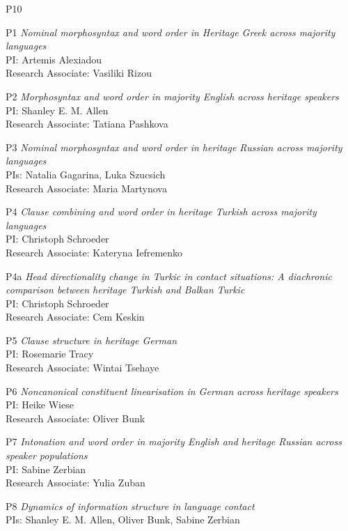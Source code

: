 \documentclass[output=paper,colorlinks,citecolor=brown]{langscibook}
\begin{document}
\begin{labeling}{P10}
\item[P1] \textit{Nominal morphosyntax and word order in Heritage Greek across majority languages} \\
    PI: Artemis Alexiadou \\
    Research Associate: Vasiliki Rizou
\item[P2] \textit{Morphosyntax and word order in majority English across heritage speakers} \\
    PI: Shanley E. M. Allen \\
    Research Associate: Tatiana Pashkova 
\item[P3] \textit{Nominal morphosyntax and word order in heritage Russian across majority languages} \\
    PIs: Natalia Gagarina, Luka Szucsich \\
    Research Associate: Maria Martynova
\item[P4] \textit{Clause combining and word order in heritage Turkish across majority languages} \\
    PI: Christoph Schroeder \\
    Research Associate: Kateryna Iefremenko
\item[P4a] \textit{Head directionality change in Turkic in contact situations: A diachronic comparison between heritage Turkish and Balkan Turkic} \\
    PI: Christoph Schroeder \\
    Research Associate: Cem Keskin
\item[P5] \textit{Clause structure in heritage German} \\
    PI: Rosemarie Tracy \\
    Research Associate: Wintai Tsehaye
\item[P6] \textit{Noncanonical constituent linearisation in German across heritage speakers} \\
    PI: Heike Wiese \\
    Research Associate: Oliver Bunk
\item[P7] \textit{Intonation and word order in majority English and heritage Russian across speaker populations} \\
    PI: Sabine Zerbian \\
    Research Associate: Yulia Zuban
\item[P8] \textit{Dynamics of information structure in language contact} \\
    PIs: Shanley E. M. Allen, Oliver Bunk, Sabine Zerbian \\

\end{labeling}
\end{document}
